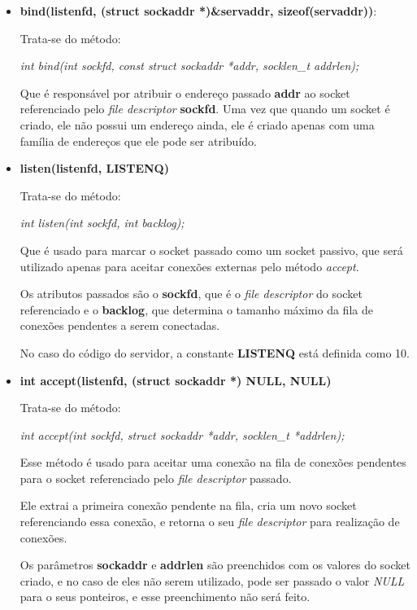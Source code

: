 \documentclass[12pt,a4paper]{report}
\begin{document}
\begin{itemize}
  \item \textbf{bind(listenfd, (struct sockaddr *)\&servaddr, sizeof(servaddr))}: 

  Trata-se do método:

  \emph{int bind(int sockfd, const struct sockaddr *addr, socklen\_t addrlen);}

  Que é responsável por atribuir o endereço passado \textbf{addr} ao socket referenciado pelo \emph{file descriptor} \textbf{sockfd}. Uma vez que quando um socket é criado, ele não possui um endereço ainda, ele é criado apenas com uma família de endereços que ele pode ser atribuído.

  \item \textbf{listen(listenfd, LISTENQ)}
  
  Trata-se do método:

  \emph{int listen(int sockfd, int backlog);}

  Que é usado para marcar o socket passado como um socket passivo, que será utilizado apenas para aceitar conexões externas pelo método \emph{accept}.

  \bigbreak

  Os atributos passados são o \textbf{sockfd}, que é o \emph{file descriptor} do socket referenciado e o \textbf{backlog}, que determina o tamanho máximo da fila de conexões pendentes a serem conectadas.

  No caso do código do servidor, a constante \textbf{LISTENQ} está definida como 10.

  \item \textbf{int accept(listenfd, (struct sockaddr *) NULL, NULL)}

  Trata-se do método:

  \emph{int accept(int sockfd, struct sockaddr *addr, socklen\_t *addrlen);}

  Esse método é usado para aceitar uma conexão na fila de conexões pendentes para o socket referenciado pelo \emph{file descriptor} passado.

  Ele extrai a primeira conexão pendente na fila, cria um novo socket referenciando essa conexão, e retorna o seu \emph{file descriptor} para realização de conexões.

  \bigbreak

  Os parâmetros \textbf{sockaddr} e \textbf{addrlen} são preenchidos com os valores do socket criado, e no caso de eles não serem utilizado, pode ser passado o valor \emph{NULL} para o seus ponteiros, e esse preenchimento não será feito.

\end{itemize}
\end{document}
